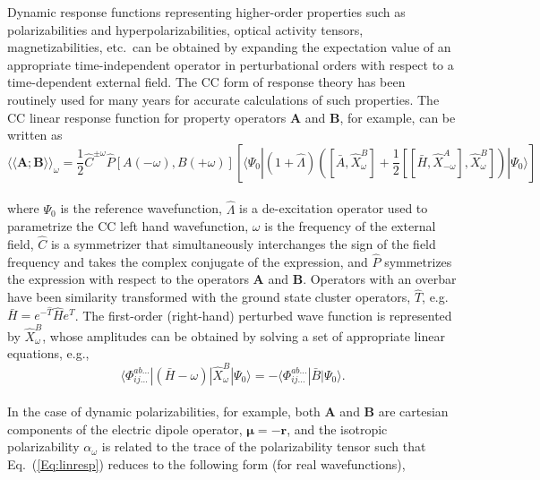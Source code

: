 Dynamic response functions representing higher-order properties such as
polarizabilities and hyperpolarizabilities, optical activity tensors,
magnetizabilities, etc.\ can be obtained by expanding the expectation value of
an appropriate time-independent operator in perturbational orders with respect
to a time-dependent external field.  The CC form of response
theory has been routinely used for many years for accurate calculations of
such properties.\cite{Helgaker12} The CC linear response function for
property operators $\bm{A}$ and $\bm{B}$, for example, can be written
as
\\
\begin{equation}
{\langle\langle\bm{A};\bm{B}\rangle\rangle}_\omega=
\frac{1}{2}\hat{C}^{\pm\omega}\hat{P}[A(-\omega),B(+\omega)] \left[
\langle\Psi_0|(1+\hat{\Lambda})\left( [\bar{A},\hat{X}^B_{\omega}] +
\frac{1}{2}[[\bar{H},\hat{X}^{A}_{-\omega}], \hat{X}^{B}_{\omega}]
\right) |\Psi_0\rangle \right]
\label{Eq:linresp}
\end{equation}
\\
where $\Psi_0$ is the reference wavefunction, $\hat{\Lambda}$ is a
de-excitation operator used to parametrize the CC left hand wavefunction,
$\omega$ is the frequency of the external field, $\hat{C}$ is a symmetrizer
that simultaneously interchanges the sign of the field frequency and takes the
complex conjugate of the expression, and $\hat{P}$ symmetrizes the expression
with respect to the operators $\bm{A}$ and $\bm{B}$. Operators with an
overbar have been similarity transformed with the ground state cluster
operators, $\hat{T}$, e.g. $\bar{H} = e^{-\hat{T}}\hat{H}e^{\hat{T}}$. The
first-order (right-hand) perturbed wave function is represented by
${\hat{X}^{B}_{\omega}}$, whose amplitudes can be obtained by solving a set
of appropriate linear equations, e.g.,
\\
\begin{equation}
\langle\Phi_{ij\ldots}^{ab\ldots}|(\bar{H}-\omega)|\hat{X}^{B}_{\omega}|\Psi_0\rangle
= -\langle\Phi_{ij\ldots}^{ab\ldots}|\bar{B}|\Psi_0\rangle.
\label{Eq:perturbed_wfn}
\end{equation} 
\\
In the case of dynamic polarizabilities, for example, both $\bm{A}$ and
$\bm{B}$ are cartesian components of the electric dipole operator, $\bm{\mu}
= -\bm{r}$, and the isotropic polarizability $\alpha_{\omega}$ is
related to the trace of the polarizability tensor such that Eq.\
(\ref{Eq:linresp}) reduces to the following form (for real
wavefunctions),
\\
